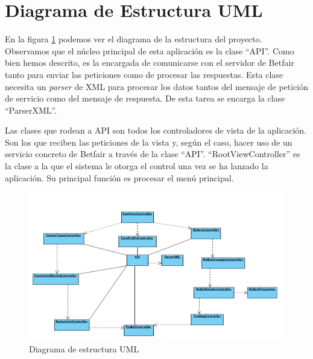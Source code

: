 \section{Diagrama de Estructura UML}
 En la figura \ref{fig:estructura} podemos ver el diagrama de la estructura del proyecto. Observamos que el núcleo principal de esta aplicación es la clase ``API''. Como bien hemos descrito, es la encargada de comunicarse con el servidor de Betfair tanto para enviar las peticiones como de procesar las respuestas. Esta clase necesita un \emph{parser} de XML para procesar los datos tantos del mensaje de petición de servicio como del mensaje de respuesta. De esta tarea se encarga la clase ``ParserXML''.
 
  Las clases que rodean a API son todos los controladores de vista de la aplicación. Son los que reciben las peticiones de la vista y, según el caso, hacer uso de un servicio concreto de Betfair a través de la clase ``API''. ``RootViewController'' es la clase a la que el sistema le otorga el control una vez se ha lanzado la aplicación. Su principal función es procesar el menú principal.

 \begin{figure}[h!]
    \centering
       \includegraphics[width=0.95\linewidth]{./images/UML_Diagram.png}
     \caption{Diagrama de estructura UML}
   \label{fig:estructura}
\end{figure}

